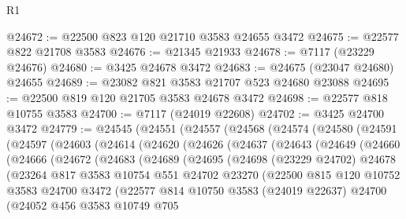 \begin{lexlean}{R1}
\begin{coremodule}
@24672 := @22500 @823 @120 @21710 @3583 @24655 @3472
@24675 := @22577 @822 @21708 @3583
@24676 := @21345 @21933
@24678 := @7117 (@23229 @24676)
@24680 := @3425 @24678 @3472
@24683 := @24675 (@23047 @24680) @24655
@24689 := @23082 @821 @3583 @21707 @523 @24680 @23088
@24695 := @22500 @819 @120 @21705 @3583 @24678 @3472
@24698 := @22577 @818 @10755 @3583
@24700 := @7117 (@24019 @22608)
@24702 := @3425 @24700 @3472
@24779 := @24545
    (@24551
      (@24557
        (@24568
          (@24574
            (@24580
              (@24591
                (@24597
                  (@24603
                    (@24614
                      (@24620
                        (@24626
                          (@24637
                            (@24643
                              (@24649
                                (@24660
                                  (@24666
                                    (@24672
                                      (@24683
                                        (@24689
                                          (@24695
                                            (@24698
                                              (@23229 @24702)
                                              @24678
                                              (@23264
                                                @817
                                                @3583
                                                @10754
                                                @551
                                                @24702
                                                @23270
                                                (@22500
                                                  @815
                                                  @120
                                                  @10752
                                                  @3583
                                                  @24700
                                                  @3472
                                                  (@22577
                                                    @814
                                                    @10750
                                                    @3583
                                                    (@24019 @22637)
                                                    @24700
                                                    (@24052
                                                      @456
                                                      @3583
                                                      @10749
                                                      @705

\end{coremodule}
\end{lexlean}
